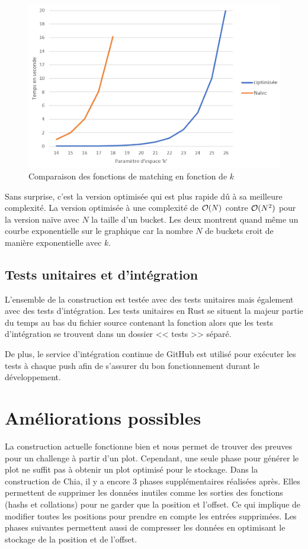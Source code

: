 \begin{figure}[H]
  \centering
  \includegraphics[width=14cm]{images/bench_matching.png}
  \caption{Comparaison des fonctions de matching en fonction de $k$}
\end{figure}

Sans surprise, c'est la version optimisée qui est plus rapide dû à sa meilleure complexité. La version optimisée à une complexité de $\mathcal{O}(N)$ contre $\mathcal{O}(N^2)$ pour la version naïve avec $N$ la taille d'un bucket. Les deux montrent quand même un courbe exponentielle sur le graphique car la nombre $N$ de buckets croit de manière exponentielle avec $k$.

\subsection{Tests unitaires et d'intégration}

L'ensemble de la construction est testée avec des tests unitaires mais également avec des tests d'intégration. Les tests unitaires en Rust se situent la majeur partie du temps au bas du fichier source contenant la fonction alors que les tests d'intégration se trouvent dans un dossier << tests >> séparé. 

De plus, le service d'intégration continue de GitHub est utilisé pour exécuter les tests à chaque push afin de s'assurer du bon fonctionnement durant le développement. 

\section{Améliorations possibles}

La construction actuelle fonctionne bien et nous permet de trouver des preuves pour un challenge à partir d'un plot. Cependant, une seule phase pour générer le plot ne suffit pas à obtenir un plot optimisé pour le stockage. Dans la construction de Chia, il y a encore 3 phases supplémentaires réalisées après. Elles permettent de supprimer les données inutiles comme les sorties des fonctions (hashs et collations) pour ne garder que la position et l'offset. Ce qui implique de modifier toutes les positions pour prendre en compte les entrées supprimées. Les phases suivantes permettent aussi de compresser les données en optimisant le stockage de la position et de l'offset.

